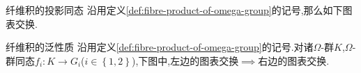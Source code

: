 \begin{proposition}{纤维积的投影同态}{}
	沿用定义\ref{def:fibre-product-of-omega-group}的记号,那么如下图表交换.
	\begin{center}
	\end{center}
\end{proposition}

\begin{proposition}{纤维积的泛性质}{}
	沿用定义\ref{def:fibre-product-of-omega-group}的记号.对诸$\Omega$-群$K$,$\Omega$-群同态$f_{i}:K\to G_{i}$($i\in\left\{1,2\right\}$),下图中,左边的图表交换$\implies$右边的图表交换.
	\begin{center}
	\end{center}
\end{proposition}










































